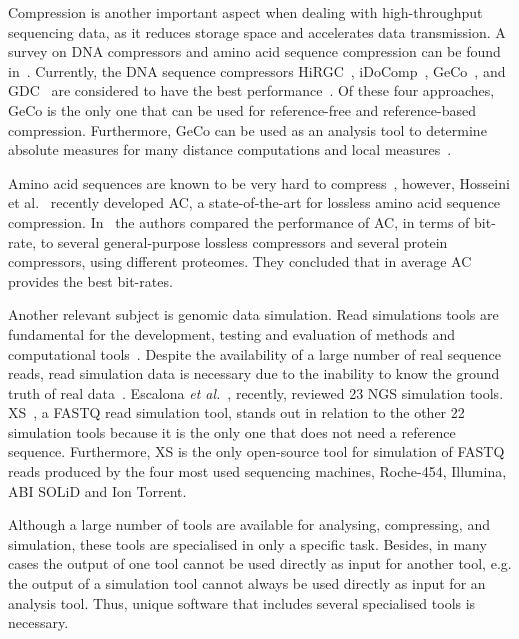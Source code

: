 Compression is another important aspect when dealing with high-throughput sequencing data, as it reduces storage space and accelerates data transmission. A survey on DNA compressors and amino acid sequence compression can be found in~\cite{hosseini2016survey}. Currently, the DNA sequence compressors HiRGC~\cite{liu2017high}, iDoComp~\cite{ochoa2014idocomp}, GeCo~\cite{pratas2016efficient}, and GDC~\cite{deorowicz2015gdc} are considered to have the best performance~\cite{hernaez2019genomic}. Of these four approaches, GeCo is the only one that can be used for reference-free and reference-based compression. Furthermore, GeCo can be used as an analysis tool to determine absolute measures for many distance computations and local measures~\cite{pratas2016efficient}.

Amino acid sequences are known to be very hard to compress~\cite{nalbantoglu2010data}, however, Hosseini et al.~\cite{hosseini2019ac} recently developed AC, a state-of-the-art for lossless amino acid sequence compression. In~\cite{pratas2018compression} the authors compared the performance of AC, in terms of bit-rate, to several general-purpose lossless compressors and several protein compressors, using different proteomes. They concluded that in average AC provides the best bit-rates.

Another relevant subject is genomic data simulation. Read simulations tools are fundamental for the development, testing and evaluation of methods and computational tools~\cite{huang2011art,price2017simulome}. Despite the availability of a large number of real sequence reads, read simulation data is necessary due to the inability to know the ground truth of real data~\cite{baruzzo2017simulation}. Escalona \textit{et al.}~\cite{escalona2016comparison}, recently, reviewed 23 NGS simulation tools. XS~\cite{pratas2014xs}, a FASTQ read simulation tool, stands out in relation to the other 22 simulation tools because it is the only one that does not need a reference sequence. Furthermore, XS is the only open-source tool for simulation of FASTQ reads produced by the four most used sequencing machines, Roche-454, Illumina, ABI SOLiD and Ion Torrent. 

Although a large number of tools are available for analysing, compressing, and simulation, these tools are specialised in only a specific task. Besides, in many cases the output of one tool cannot be used directly as input for another tool, e.g. the output of a simulation tool cannot always be used directly as input for an analysis tool. Thus, unique software that includes several specialised tools is necessary.

